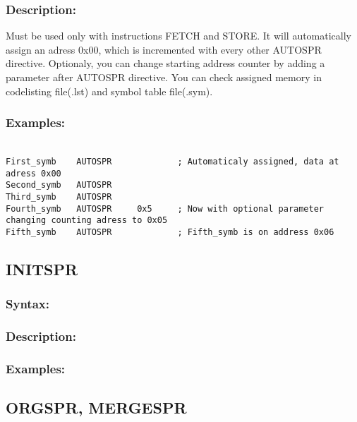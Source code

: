 {    \subsubsection{Description:}
    Must be used only with instructions FETCH and STORE. It will automatically assign an
    adress 0x00, which is incremented with every other AUTOSPR directive. Optionaly, you can change starting address counter by adding a parameter
    after AUTOSPR directive. You can check assigned memory in codelisting file(.lst) and symbol table file(.sym).

    \subsubsection{Examples:}
        {
            ~\\
            \usecodefont
            \verb'First_symb    AUTOSPR             ; Automaticaly assigned, data at adress 0x00'\\
            \verb'Second_symb   AUTOSPR'\\
            \verb'Third_symb    AUTOSPR'\\
            \verb'Fourth_symb   AUTOSPR     0x5     ; Now with optional parameter changing counting adress to 0x05'\\
            \verb'Fifth_symb    AUTOSPR             ; Fifth_symb is on address 0x06'\\
        }
            
    \subsection{INITSPR}
        \subsubsection{Syntax:}

        \subsubsection{Description:}
 
        \subsubsection{Examples:}


    \subsection{ORGSPR, MERGESPR}
}
